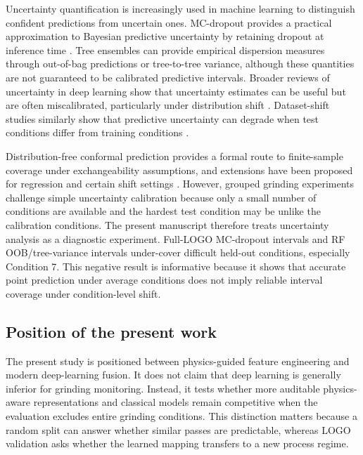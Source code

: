 Uncertainty quantification is increasingly used in machine learning to distinguish confident predictions from uncertain ones. MC-dropout provides a practical approximation to Bayesian predictive uncertainty by retaining dropout at inference time \cite{gal2016dropout}. Tree ensembles can provide empirical dispersion measures through out-of-bag predictions or tree-to-tree variance, although these quantities are not guaranteed to be calibrated predictive intervals. Broader reviews of uncertainty in deep learning show that uncertainty estimates can be useful but are often miscalibrated, particularly under distribution shift \cite{Abdar2021}. Dataset-shift studies similarly show that predictive uncertainty can degrade when test conditions differ from training conditions \cite{ovadia2019can}.

Distribution-free conformal prediction provides a formal route to finite-sample coverage under exchangeability assumptions, and extensions have been proposed for regression and certain shift settings \cite{Angelopoulos2023}. However, grouped grinding experiments challenge simple uncertainty calibration because only a small number of conditions are available and the hardest test condition may be unlike the calibration conditions. The present manuscript therefore treats uncertainty analysis as a diagnostic experiment. Full-LOGO MC-dropout intervals and RF OOB/tree-variance intervals under-cover difficult held-out conditions, especially Condition 7. This negative result is informative because it shows that accurate point prediction under average conditions does not imply reliable interval coverage under condition-level shift.

\subsection{Position of the present work}\label{rw:position}

The present study is positioned between physics-guided feature engineering and modern deep-learning fusion. It does not claim that deep learning is generally inferior for grinding monitoring. Instead, it tests whether more auditable physics-aware representations and classical models remain competitive when the evaluation excludes entire grinding conditions. This distinction matters because a random split can answer whether similar passes are predictable, whereas LOGO validation asks whether the learned mapping transfers to a new process regime.

